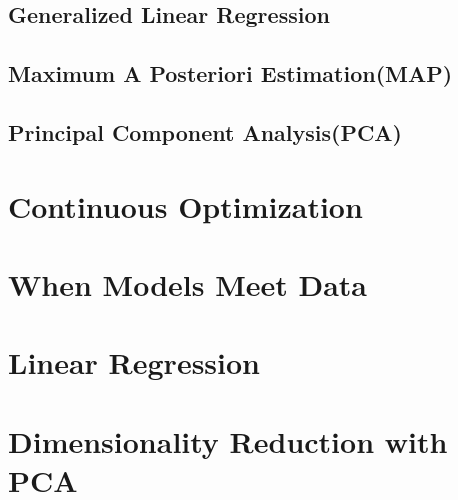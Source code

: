 \documentclass[12pt,openany]{book}
\theoremstyle{definition}
\begin{document}
	\section{Generalized Linear Regression}
	\section{Maximum A Posteriori Estimation(MAP)}
	\section{Principal Component Analysis(PCA)}
	
	\chapter{Continuous Optimization}
	
	\chapter{When Models Meet Data}
	
	\chapter{Linear Regression}
	
	\chapter{Dimensionality Reduction with PCA}
\end{document}
